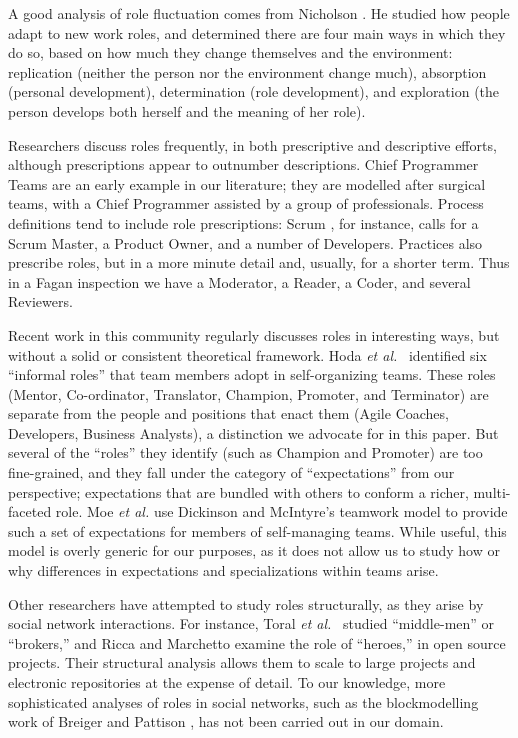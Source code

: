\documentclass[10pt, conference, compsocconf]{IEEEtran}
\begin{document}
A good analysis of role fluctuation comes from Nicholson \cite{Nicholson1984}. He studied how people adapt to new work roles, and determined there are four main ways in which they do so, based on how much they change themselves and the environment: replication (neither the person nor the environment change much), absorption (personal development), determination (role development), and exploration (the person develops both herself and the meaning of her role).


Researchers discuss roles frequently, in both prescriptive and descriptive efforts, although prescriptions appear to outnumber descriptions. Chief Programmer Teams \cite{Baker1972} are an early example in our literature; they are modelled after surgical teams, with a Chief Programmer assisted by a group of professionals. Process definitions tend to include role prescriptions: Scrum \cite{Schwaber2001}, for instance, calls for a Scrum Master, a Product Owner, and a number of Developers. Practices also prescribe roles, but in a more minute detail and, usually, for a shorter term. Thus in a Fagan inspection \cite{Fagan1976} we have a Moderator, a Reader, a Coder, and several Reviewers.

Recent work in this community regularly discusses roles in interesting ways, but without a solid or consistent theoretical framework. Hoda \emph{et al.}\ \cite{Hoda2010} identified six ``informal roles'' that team members adopt in self-organizing teams. These roles (Mentor, Co-ordinator, Translator, Champion, Promoter, and Terminator) are separate from the people and positions that enact them (Agile Coaches, Developers, Business Analysts), a distinction we advocate for in this paper. But several of the ``roles'' they identify (such as Champion and Promoter) are too fine-grained, and they fall under the category of ``expectations'' from our perspective; expectations that are bundled with others to conform a richer, multi-faceted role. Moe \emph{et al.} \cite{Moe2010} use Dickinson and McIntyre's \cite{Dickinson1997} teamwork model to provide such a set of expectations for members of self-managing teams. While useful, this model is overly generic for our purposes, as it does not allow us to study how or why differences in expectations and specializations within teams arise.

Other researchers have attempted to study roles structurally, as they arise by social network interactions. For instance, Toral \emph{et al.}\ \cite{Toral2010} studied ``middle-men'' or ``brokers,'' and Ricca and Marchetto \cite{Ricca2010} examine the role of ``heroes,'' in open source projects. Their structural analysis allows them to scale to large projects and electronic repositories at the expense of detail. To our knowledge, more sophisticated analyses of roles in social networks, such as the blockmodelling work of Breiger and Pattison \cite{Breiger1986}, has not been carried out in our domain.
\end{document}
